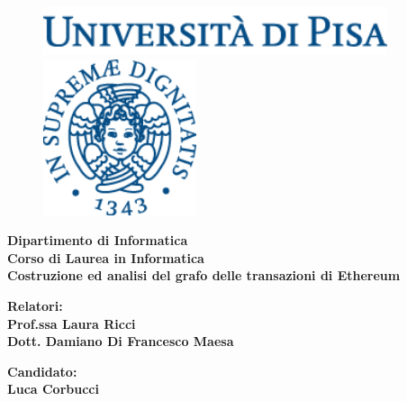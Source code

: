 \documentclass[12pt]{report}
\begin{document}
\begin{titlepage}
\begin{figure}[t]
	\centering\includegraphics[width=0.9\textwidth]{scritta}
    \centering\includegraphics[width=0.4\textwidth]{logo}
\end{figure}

\begin{center}
	\textbf{ Dipartimento di Informatica\\ Corso di Laurea in Informatica\\}
	\vspace{15mm}
    {\LARGE{\bf Costruzione ed analisi del grafo delle transazioni di Ethereum}}\\
	\vspace{3mm}
	
\end{center}

\vspace{36mm}

\begin{minipage}[t]{0.52\textwidth}\raggedright
	{\large{\bf Relatori:\\ Prof.ssa Laura Ricci\\Dott. Damiano Di Francesco Maesa} }
\end{minipage}\hfill\begin{minipage}[t]{0.30\textwidth}\raggedleft
	{\large{\bf Candidato: \\ Luca Corbucci\\ }}
\end{minipage}

\vspace{18mm}


\end{titlepage}
\end{document}
